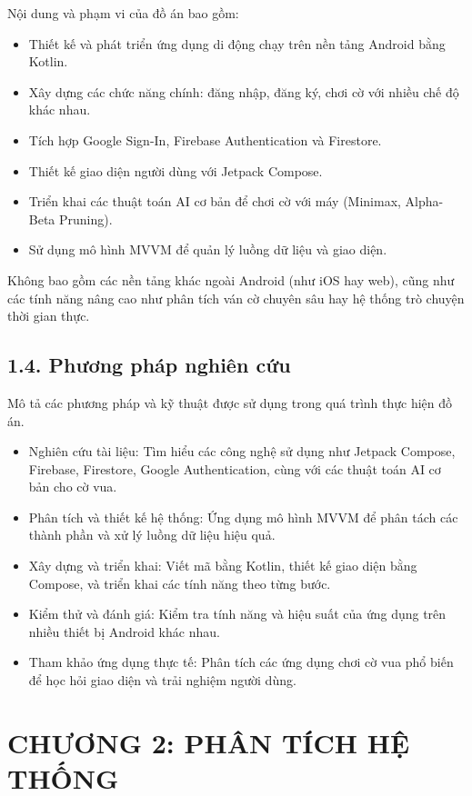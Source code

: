 \documentclass[a4paper,12pt]{article}
\begin{document}
\justify
\noindent Nội dung và phạm vi của đồ án bao gồm:
\begin{itemize}[label=·]
    \item Thiết kế và phát triển ứng dụng di động chạy trên nền tảng Android bằng Kotlin.
    \item Xây dựng các chức năng chính: đăng nhập, đăng ký, chơi cờ với nhiều chế độ khác nhau.
    \item Tích hợp Google Sign-In, Firebase Authentication và Firestore.
    \item Thiết kế giao diện người dùng với Jetpack Compose.
    \item Triển khai các thuật toán AI cơ bản để chơi cờ với máy (Minimax, Alpha-Beta Pruning).
    \item Sử dụng mô hình MVVM để quản lý luồng dữ liệu và giao diện.
\end{itemize}
\noindent Không bao gồm các nền tảng khác ngoài Android (như iOS hay web), cũng như các tính năng nâng cao như phân tích ván cờ chuyên sâu hay hệ thống trò chuyện thời gian thực.

\subsection*{1.4. Phương pháp nghiên cứu}

\justify
\noindent Mô tả các phương pháp và kỹ thuật được sử dụng trong quá trình thực hiện đồ án.
\begin{itemize}[label=·]
    \item Nghiên cứu tài liệu: Tìm hiểu các công nghệ sử dụng như Jetpack Compose, Firebase, Firestore, Google Authentication, cùng với các thuật toán AI cơ bản cho cờ vua.
    \item Phân tích và thiết kế hệ thống: Ứng dụng mô hình MVVM để phân tách các thành phần và xử lý luồng dữ liệu hiệu quả.
    \item Xây dựng và triển khai: Viết mã bằng Kotlin, thiết kế giao diện bằng Compose, và triển khai các tính năng theo từng bước.
    \item Kiểm thử và đánh giá: Kiểm tra tính năng và hiệu suất của ứng dụng trên nhiều thiết bị Android khác nhau.
    \item Tham khảo ứng dụng thực tế: Phân tích các ứng dụng chơi cờ vua phổ biến để học hỏi giao diện và trải nghiệm người dùng.
\end{itemize}

\section*{\centering \textbf{CHƯƠNG 2: PHÂN TÍCH HỆ THỐNG}} %
\end{document}

